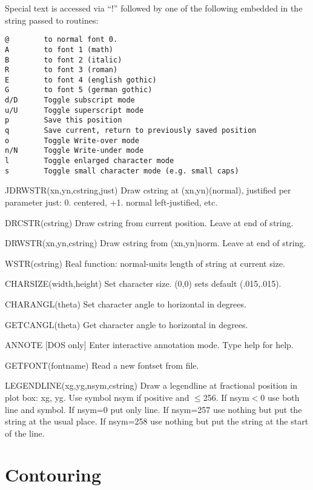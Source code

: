 \documentclass[12pt]{article}
\newif \iftth
\begin{document}
\iftth \special{html:<img align="right" src="fontshow.png">} \fi

Special text is accessed via ``!'' followed by one of 
the following embedded in the string passed to routines:
\begin{verbatim}
@        to normal font 0.
A        to font 1 (math)
B        to font 2 (italic)
R        to font 3 (roman)
E        to font 4 (english gothic)
G        to font 5 (german gothic)
d/D      Toggle subscript mode
u/U      Toggle superscript mode
p        Save this position
q        Save current, return to previously saved position
o        Toggle Write-over mode
n/N      Toggle Write-under mode
l        Toggle enlarged character mode
s        Toggle small character mode (e.g. small caps)
\end{verbatim}


JDRWSTR(xn,yn,cstring,just) Draw cstring at (xn,yn)(normal), justified
per parameter just:  0. centered, +1. normal left-justified, etc.

DRCSTR(cstring) Draw cstring from current position. Leave at end of string.

DRWSTR(xn,yn,cstring) Draw cstring from (xn,yn)norm. Leave at end of
string.

WSTR(cstring) Real function: normal-units length of string at current size.

CHARSIZE(width,height) Set character size. (0,0) sets default (.015,.015).

CHARANGL(theta) Set character angle to horizontal in degrees.

GETCANGL(theta) Get character angle to horizontal in degrees.

ANNOTE [DOS only] Enter interactive annotation mode. Type help for help.

GETFONT(fontname) Read a new fontset from file.

LEGENDLINE(xg,yg,nsym,cstring) Draw a legendline at fractional
position in plot box: xg, yg.  Use symbol nsym if positive and $\le$256.
If nsym$<$0 use both line and symbol. If nsym=0 put only line.  
If nsym=257 use nothing but put the string at the usual place.
If nsym=258 use nothing but put the string at the start of the line.

\section{Contouring}

\iftth \special{html:<a href="contest.f"><img align="right" src="contest.png"></a>}\fi
\end{document}

